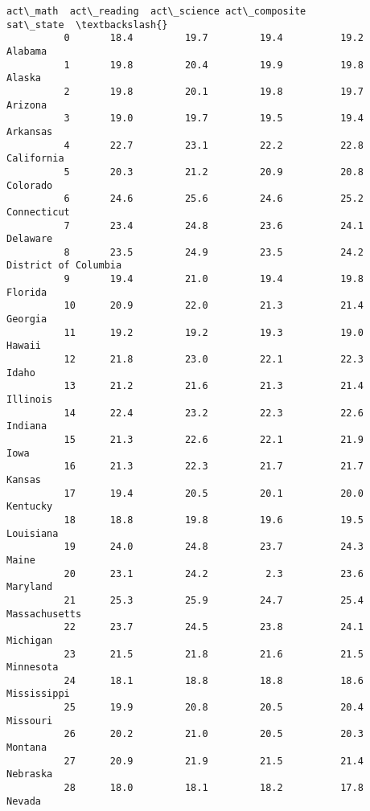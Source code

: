 \documentclass[11pt]{article}
\begin{document}
\begin{Verbatim}[commandchars=\\\{\}]
              act\_math  act\_reading  act\_science act\_composite             sat\_state  \textbackslash{}
          0       18.4         19.7         19.4          19.2               Alabama   
          1       19.8         20.4         19.9          19.8                Alaska   
          2       19.8         20.1         19.8          19.7               Arizona   
          3       19.0         19.7         19.5          19.4              Arkansas   
          4       22.7         23.1         22.2          22.8            California   
          5       20.3         21.2         20.9          20.8              Colorado   
          6       24.6         25.6         24.6          25.2           Connecticut   
          7       23.4         24.8         23.6          24.1              Delaware   
          8       23.5         24.9         23.5          24.2  District of Columbia   
          9       19.4         21.0         19.4          19.8               Florida   
          10      20.9         22.0         21.3          21.4               Georgia   
          11      19.2         19.2         19.3          19.0                Hawaii   
          12      21.8         23.0         22.1          22.3                 Idaho   
          13      21.2         21.6         21.3          21.4              Illinois   
          14      22.4         23.2         22.3          22.6               Indiana   
          15      21.3         22.6         22.1          21.9                  Iowa   
          16      21.3         22.3         21.7          21.7                Kansas   
          17      19.4         20.5         20.1          20.0              Kentucky   
          18      18.8         19.8         19.6          19.5             Louisiana   
          19      24.0         24.8         23.7          24.3                 Maine   
          20      23.1         24.2          2.3          23.6              Maryland   
          21      25.3         25.9         24.7          25.4         Massachusetts   
          22      23.7         24.5         23.8          24.1              Michigan   
          23      21.5         21.8         21.6          21.5             Minnesota   
          24      18.1         18.8         18.8          18.6           Mississippi   
          25      19.9         20.8         20.5          20.4              Missouri   
          26      20.2         21.0         20.5          20.3               Montana   
          27      20.9         21.9         21.5          21.4              Nebraska   
          28      18.0         18.1         18.2          17.8                Nevada   

\end{Verbatim}
\end{document}

